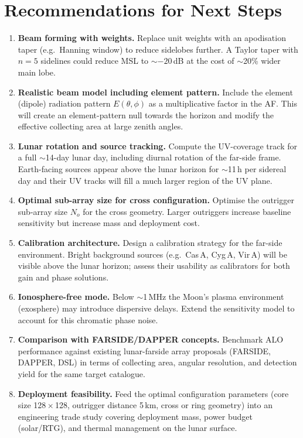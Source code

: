 \documentclass[12pt,a4paper]{article}
\begin{document}
\section{Recommendations for Next Steps}
\label{sec:recommendations}

\begin{enumerate}
  \item \textbf{Beam forming with weights.}
    Replace unit weights with an apodisation taper (e.g.\ Hanning window) to
    reduce sidelobes further.
    A Taylor taper with $n = 5$ sidelines could reduce MSL to $\sim -20$\,dB
    at the cost of $\sim$20\% wider main lobe.

  \item \textbf{Realistic beam model including element pattern.}
    Include the element (dipole) radiation pattern $E(\theta, \phi)$ as a
    multiplicative factor in the AF.
    This will create an element-pattern null towards the horizon and modify the
    effective collecting area at large zenith angles.

  \item \textbf{Lunar rotation and source tracking.}
    Compute the UV-coverage track for a full $\sim$14-day lunar day, including
    diurnal rotation of the far-side frame.
    Earth-facing sources appear above the lunar horizon for $\sim$11\,h
    per sidereal day and their UV tracks will fill a much larger region of the
    UV plane.

  \item \textbf{Optimal sub-array size for cross configuration.}
    Optimise the outrigger sub-array size $N_o$ for the cross geometry.
    Larger outriggers increase baseline sensitivity but increase mass and
    deployment cost.

  \item \textbf{Calibration architecture.}
    Design a calibration strategy for the far-side environment.
    Bright background sources (e.g.\ Cas\,A, Cyg\,A, Vir\,A) will be visible
    above the lunar horizon; assess their usability as calibrators for both
    gain and phase solutions.

  \item \textbf{Ionosphere-free mode.}
    Below $\sim$1\,MHz the Moon's plasma environment (exosphere) may introduce
    dispersive delays.
    Extend the sensitivity model to account for this chromatic phase noise.

  \item \textbf{Comparison with FARSIDE/DAPPER concepts.}
    Benchmark ALO performance against existing lunar-farside array proposals
    (FARSIDE, DAPPER, DSL) in terms of collecting area, angular resolution,
    and detection yield for the same target catalogue.

  \item \textbf{Deployment feasibility.}
    Feed the optimal configuration parameters (core size 128\,$\times$\,128,
    outrigger distance 5\,km, cross or ring geometry) into an engineering
    trade study covering deployment mass, power budget (solar/RTG), and
    thermal management on the lunar surface.
\end{enumerate}
\end{document}
